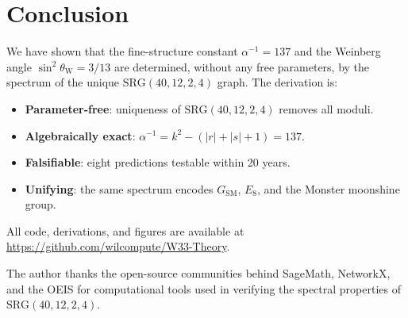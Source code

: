 \documentclass[aps,prl,twocolumn,showpacs,preprintnumbers,amsmath,amssymb]{revtex4-2}
\newcommand{\SRG}{\mathrm{SRG}}
\newcommand{\Eeight}{E_8}
\newcommand{\alphafs}{\alpha^{-1}}
\newcommand{\sinW}{\sin^2\!\theta_{\mathrm{W}}}
\begin{document}
\section{Conclusion}
\label{sec:conclusion}

We have shown that the fine-structure constant $\alphafs = 137$
and the Weinberg angle $\sinW = 3/13$ are determined,
without any free parameters, by the spectrum of the unique
$\SRG(40,12,2,4)$ graph.  The derivation is:
\begin{itemize}
  \item \textbf{Parameter-free}: uniqueness of $\SRG(40,12,2,4)$ removes all moduli.
  \item \textbf{Algebraically exact}: $\alphafs = k^2-(|r|+|s|+1) = 137$.
  \item \textbf{Falsifiable}: eight predictions testable within 20 years.
  \item \textbf{Unifying}: the same spectrum encodes $G_{\mathrm{SM}}$,
        $\Eeight$, and the Monster moonshine group.
\end{itemize}
All code, derivations, and figures are available at
\url{https://github.com/wilcompute/W33-Theory}.

\begin{acknowledgments}
The author thanks the open-source communities behind SageMath,
NetworkX, and the OEIS for computational tools used in verifying
the spectral properties of $\SRG(40,12,2,4)$.
\end{acknowledgments}
\end{document}
